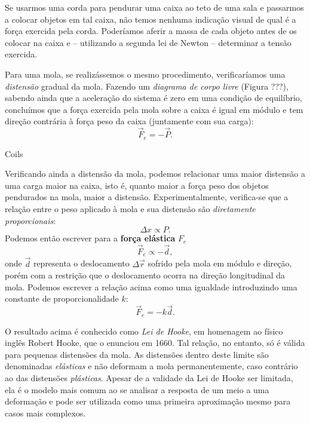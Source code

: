 Se usarmos uma corda para pendurar uma caixa ao teto de uma sala e passarmos a colocar objetos em tal caixa, não temos nenhuma indicação visual de qual é a força exercida pela corda. Poderíamos aferir a massa de cada objeto antes de os colocar na caixa e -- utilizando a segunda lei de Newton -- determinar a tensão exercida.

Para uma mola, se realizássemos o mesmo procedimento, verificaríamos uma \emph{distensão} gradual da mola. Fazendo um \emph{diagrama de corpo livre} (Figura ???), sabendo ainda que a aceleração do sistema é zero em uma condição de equilíbrio, concluímos que a força exercida pela mola sobre a caixa é igual em módulo e tem direção contrária à força peso da caixa (juntamente com sua carga):
\begin{equation}
	\vec{F}_e = -\vec{P}.
\end{equation}

\begin{marginfigure}
\centering
{}
\caption{Coils}
\end{marginfigure}

Verificando ainda a distensão da mola, podemos relacionar uma maior distensão a uma carga maior na caixa, isto é, quanto maior a força peso dos objetos pendurados na mola, maior a distensão. Experimentalmente, verifica-se que a relação entre o peso aplicado à mola e sua distensão são \emph{diretamente proporcionais}:
\begin{equation}
	\Delta x \propto P.
\end{equation}
%
Podemos então escrever para a \textbf{força elástica} $F_e$
\begin{equation}
	\vec{F}_e \propto -\vec{d},
\end{equation}
%
onde $\vec{d}$ representa o deslocamento $\Delta \vec{r}$ sofrido pela mola em módulo e direção, porém com a restrição que o deslocamento ocorra na direção longitudinal da mola. Podemos escrever a relação acima como uma igualdade introduzindo uma constante de proporcionalidade $k$:
\begin{equation}
	\vec{F}_e = -k \vec{d}.
\end{equation}

O resultado acima é conhecido como \emph{Lei de Hooke}, em homenagem ao físico inglês Robert Hooke, que o enunciou em 1660. Tal relação, no entanto, só é válida para pequenas distensões da mola. As distensões dentro deste limite são denominadas \emph{elásticas} e não deformam a mola permanentemente, caso contrário ao das distensões \emph{plásticas}. Apesar de a validade da Lei de Hooke ser limitada, ela é o modelo mais comum ao se analisar a resposta de um meio a uma deformação e pode ser utilizada como uma primeira aproximação mesmo para casos mais complexos.


